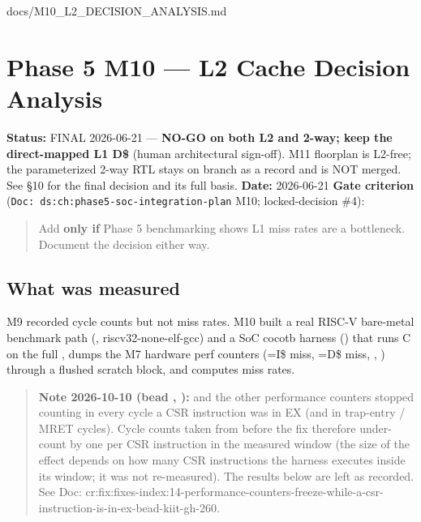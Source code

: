 \begin{relocated}{docs/M10_L2_DECISION_ANALYSIS.md}
\section{Phase 5 M10 --- L2 Cache Decision Analysis}\label{tm:dec:m10-l2}

\textbf{Status:} FINAL 2026-06-21 --- \textbf{NO-GO on both L2 and
2-way; keep the direct-mapped L1 D\$} (human architectural sign-off).
M11 floorplan is L2-free; the parameterized 2-way RTL stays on branch
 as a record and is NOT merged. See §10 for
the final decision and its full basis. \textbf{Date:} 2026-06-21
\textbf{Gate criterion}
(\texttt{Doc:\allowbreak{}\ ds:\allowbreak{}ch:\allowbreak{}phase5-\allowbreak{}soc-\allowbreak{}integration-\allowbreak{}plan}
M10;  locked-decision \#4):

\begin{quote}
Add  \textbf{only if} Phase 5 benchmarking
shows L1 miss rates are a bottleneck. Document the decision either way.
\end{quote}

\subsection{What was measured}\label{tm:dec:m10-l2:1-what-was-measured}

M9 recorded cycle counts but not miss rates. M10 built a real RISC-V
bare-metal benchmark path (, riscv32-none-elf-gcc) and a
SoC cocotb harness () that runs C on
the full , dumps the M7 hardware perf counters
(=I\$ miss, =D\$ miss,
, ) through a flushed scratch block, and
computes miss rates.

\begin{quote}
\textbf{Note 2026-10-10 (bead , ):}  and
the other  performance counters stopped counting in
every cycle a CSR instruction was in EX (and in trap-entry / MRET
cycles). Cycle counts taken from  before the fix therefore
under-count by one per CSR instruction in the measured window (the size
of the effect depends on how many CSR instructions the harness executes
inside its window; it was not re-measured). The results below are left
as recorded. See Doc:
cr:fix:fixes-index:14-performance-counters-freeze-while-a-csr-instruction-is-in-ex-bead-kiit-gh-260.
\end{quote}


\end{relocated}
